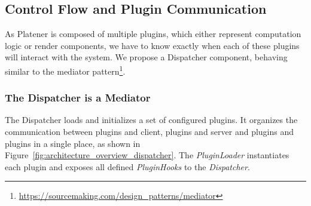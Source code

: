 \documentclass[../ClassicThesis.tex]{subfiles}
\begin{document}



\subsection{Control Flow and Plugin Communication}

As Platener is composed of multiple plugins, which either represent
computation logic or render components, we have to know exactly when
each of these plugins will interact with the system. We propose a
Dispatcher component, behaving similar to the mediator
pattern\footnote{\url{https://sourcemaking.com/design_patterns/mediator}}.

\subsubsection{The Dispatcher is a Mediator}

The Dispatcher loads and initializes a set of configured plugins. It organizes
the communication between plugins and client, plugins and server and plugins and
plugins in a single place, as shown in
Figure~\ref{fig:architecture_overview_dispatcher}. The \emph{PluginLoader}
instantiates each plugin and exposes all defined \emph{PluginHooks} to the
\emph{Dispatcher}. 

\end{document}
